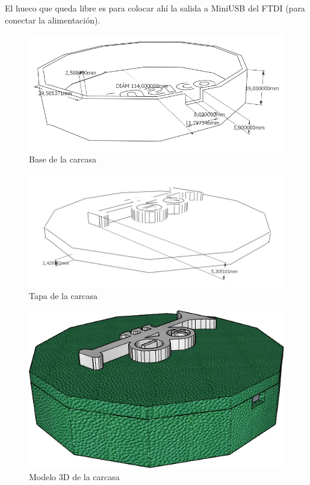 El hueco que queda libre es para colocar ahí la salida a MiniUSB del FTDI (para conectar la alimentación).\\

\begin{figure}[!htb]
\centering
\includegraphics[width=1\textwidth]{./imagenes/carcasa_base}
\caption{Base de la carcasa} \label{fig:carcasa_base}
\end{figure}

\begin{figure}[!htb]
\centering
\includegraphics[width=1\textwidth]{./imagenes/carcasa_tapa}
\caption{Tapa de la carcasa} \label{fig:carcasa_tapa}
\end{figure}

\begin{figure}[!htb]
\centering
\includegraphics[width=1\textwidth]{./imagenes/carcasa_modelo}
\caption{Modelo 3D de la carcasa} \label{fig:carcasa_modelo}
\end{figure}
